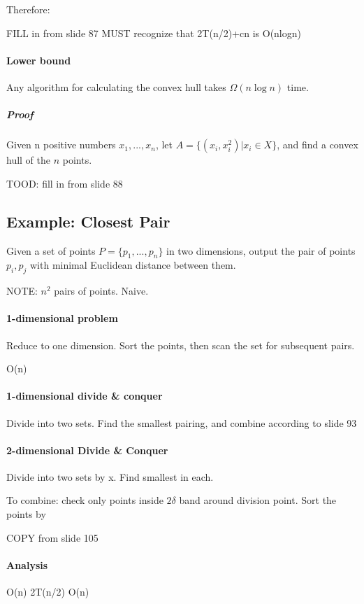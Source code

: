 \documentclass[a4paper]{article}
\begin{document}
Therefore:

FILL in from slide 87
MUST recognize that 2T(n/2)+cn is O(nlogn)

\paragraph{Lower bound}

Any algorithm for calculating the convex hull takes $\Omega(n\log n)$ time.

\subparagraph{Proof}
Given n positive numbers $x_1,...,x_n$, let $A=\{(x_i,x_i^2) | x_i \in X\}$, and find a convex hull of the $n$ points.

TOOD: fill in from slide 88

\subsection{Example: Closest Pair}

Given a set of points $P=\{p_1,...,p_n\}$ in two dimensions, output the pair of points $p_i,p_j$ with minimal Euclidean distance between them.

NOTE: $n^2$ pairs of points. Naive.

\paragraph{1-dimensional problem}

Reduce to one dimension. Sort the points, then scan the set for subsequent pairs.

O(n)

\paragraph{1-dimensional divide \& conquer}

Divide into two sets. Find the smallest pairing, and combine according to slide 93

\paragraph{2-dimensional Divide \& Conquer}

Divide into two sets by x. Find smallest in each.

To combine: check only points inside $2\delta$ band around division point.
Sort the points by 

COPY from slide 105

\paragraph{Analysis}
O(n)
2T(n/2)
O(n)
\end{document}
